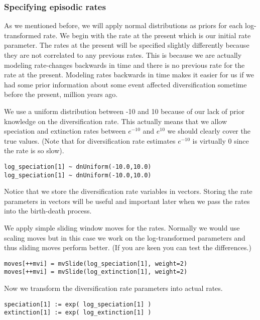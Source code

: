 \subsubsection{Specifying episodic rates}
As we mentioned before, we will apply normal distributions as priors for each log-transformed rate.
We begin with the rate at the present which is our initial rate parameter.
The rates at the present will be specified slightly differently because they are not correlated to any previous rates.
This is because we are actually modeling rate-changes backwards in time and there is no previous rate for the rate at the present.
Modeling rates backwards in time makes it easier for us if we had some prior information about some event affected diversification sometime before the present,  million years ago.

We use a uniform distribution between -10 and 10 because of our lack of prior knowledge on the diversification rate.
This actually means that we allow speciation and extinction rates between $e^{-10}$ and $e^10$ we should clearly cover the true values.
(Note that for diversification rate estimates $e^{-10}$ is virtually 0 since the rate is so slow).
{\tt \begin{snugshade*}
\begin{lstlisting}
log_speciation[1] ~ dnUniform(-10.0,10.0)
log_speciation[1] ~ dnUniform(-10.0,10.0)
\end{lstlisting}
\end{snugshade*}}
Notice that we store the diversification rate variables in vectors.
Storing the rate parameters in vectors will be useful and important later when we pass the rates into the birth-death process.

We apply simple sliding window moves for the rates.
Normally we would use scaling moves but in this case we work on the log-transformed parameters and thus sliding moves perform better.
(If you are keen you can test the differences.)
{\tt \begin{snugshade*}
\begin{lstlisting}
moves[++mvi] = mvSlide(log_speciation[1], weight=2)
moves[++mvi] = mvSlide(log_extinction[1], weight=2)
\end{lstlisting}
\end{snugshade*}}
Now we transform the diversification rate parameters into actual rates.
{\tt \begin{snugshade*}
\begin{lstlisting}
speciation[1] := exp( log_speciation[1] )
extinction[1] := exp( log_extinction[1] )
\end{lstlisting}
\end{snugshade*}}

